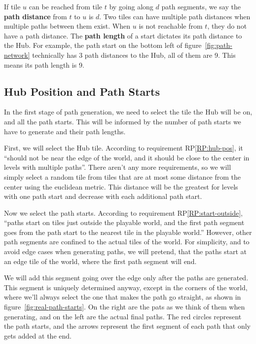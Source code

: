 If tile $u$ can be reached from tile $t$ by going along $d$ path segments, we say the \textbf{path distance} from $t$ to $u$ is $d$.
Two tiles can have multiple path distances when multiple paths between them exist.
When $u$ is not reachable from $t$, they do not have a path distance.
The \textbf{path length} of a start dictates its path distance to the Hub.
For example, the path start on the bottom left of figure~\ref{fig:path-network} technically has 3 path distances to the Hub, all of them are 9.
This means its path length is 9.

\subsection{Hub Position and Path Starts} \label{sec:analysis-path-starts}

In the first stage of path generation, we need to select the tile the Hub will be on, and all the path starts.
This will be informed by the number of path starts we have to generate and their path lengths.

First, we will select the Hub tile.
According to requirement RP\ref{RP:hub-pos}, it \enquote{should not be near the edge of the world, and it should be close to the center in levels with multiple paths}.
There aren't any more requirements, so we will simply select a random tile from tiles that are at most some distance from the center using the euclidean metric.
This distance will be the greatest for levels with one path start and decrease with each additional path start.

Now we select the path starts.
According to requirement RP\ref{RP:start-outside}, \enquote{paths start on tiles just outside the playable world, and the first path segment goes from the path start to the nearest tile in the playable world.}
However, other path segments are confined to the actual tiles of the world.
For simplicity, and to avoid edge cases when generating paths, we will pretend, that the paths start at an edge tile of the world, where the first path segment will end.

We will add this segment going over the edge only after the paths are generated.
This segment is uniquely determined anyway, except in the corners of the world, where we'll always select the one that makes the path go straight, as shown in figure~\ref{fig:real-path-starts}.
On the right are the pats as we think of them when generating, and on the left are the actual final paths.
The red circles represent the path starts, and the arrows represent the first segment of each path that only gets added at the end.

